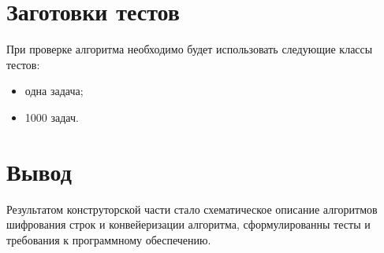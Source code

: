 \section{Заготовки тестов}
При проверке алгоритма необходимо будет использовать следующие классы тестов:
\begin{itemize}
	\item одна задача;
	\item 1000 задач.
\end{itemize}

\section*{Вывод}
Результатом конструторской части стало схематическое описание алгоритмов шифрования строк и конвейеризации алгоритма, сформулированны тесты и требования к программному обеспечению.

